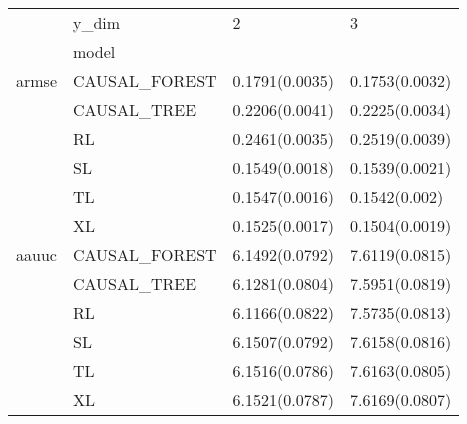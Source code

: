 \begin{tabular}{llll}
\toprule
      & y\_dim &               2 &               3 \\
{} & model &                 &                 \\
\midrule
armse & CAUSAL\_FOREST &  0.1791(0.0035) &  0.1753(0.0032) \\
      & CAUSAL\_TREE &  0.2206(0.0041) &  0.2225(0.0034) \\
      & RL &  0.2461(0.0035) &  0.2519(0.0039) \\
      & SL &  0.1549(0.0018) &  0.1539(0.0021) \\
      & TL &  0.1547(0.0016) &   0.1542(0.002) \\
      & XL &  0.1525(0.0017) &  0.1504(0.0019) \\
aauuc & CAUSAL\_FOREST &  6.1492(0.0792) &  7.6119(0.0815) \\
      & CAUSAL\_TREE &  6.1281(0.0804) &  7.5951(0.0819) \\
      & RL &  6.1166(0.0822) &  7.5735(0.0813) \\
      & SL &  6.1507(0.0792) &  7.6158(0.0816) \\
      & TL &  6.1516(0.0786) &  7.6163(0.0805) \\
      & XL &  6.1521(0.0787) &  7.6169(0.0807) \\
\bottomrule
\end{tabular}

